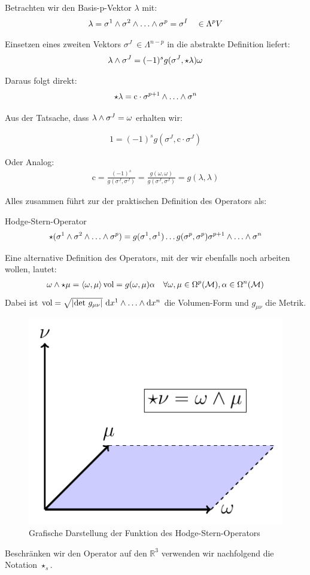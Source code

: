  Betrachten wir den Basis-p-Vektor $\lambda$ mit:
 \begin{align}
 \lambda = \sigma^1 \w \sigma^2 \w \dots \w \sigma^p = \sigma^{I} \quad \in \Lambda^p V
 \end{align}
 
 Einsetzen eines zweiten Vektors $\sigma^J \ \in \Lambda^{n-p}$ in die abstrakte Definition liefert:
\begin{align}
\lambda \wedge \sigma^J = (-1)^s g(\sigma^J,\star \lambda)\omega
\end{align}

Daraus folgt direkt:
\begin{align}
\star\lambda = \text{c} \cdot \sigma^{p+1} \w \dots \w \sigma^n
\end{align}

Aus der Tatsache, dass $\lambda\wedge\sigma^J = \omega$ erhalten wir:

\begin{align}
1 = (-1)^s g(\sigma^J,\text{c}\cdot\sigma^J)
\end{align}

Oder Analog:
\begin{align}
\text{c}= \frac{(-1)^s}{g(\sigma^J,\sigma^J)} = \frac{g(\omega,\omega)}{g(\sigma^J,\sigma^J)} = g(\lambda,\lambda)
\end{align}

Alles zusammen führt zur der praktischen Definition des Operators als:
\begin{mybox}{Hodge-Stern-Operator}
\begin{align}
\star(\sigma^1 \w \sigma^2 \w \dots \w \sigma^p) = g(\sigma^1,\sigma^1)\dots g(\sigma^p,\sigma^p) \sigma^{p+1}\w \dots \w \sigma^n
\end{align}
\end{mybox}



Eine alternative Definition des Operators, mit der wir ebenfalls noch arbeiten wollen, lautet:
\begin{align}
\omega \wedge \star \mu = \left<\omega,\mu \right>\text{vol} = g(\omega,\mu)\alpha \quad \forall \omega, \mu \in \Omega^p(\mathcal{M}), \alpha \in \Omega^n(\mathcal{M})
\end{align}
Dabei ist $\text{vol} = \sqrt{\abs{\text{det} \ g_{\mu\nu}}} \ \dd x^1 \w \dots \w \dd x^n$ die Volumen-Form und $g_{\mu\nu}$ die Metrik. \\
\begin{figure}[H]
	\centering
	\includegraphics[width=.3\linewidth]{figures/darstellung-hodge.pdf}
	\caption{Grafische Darstellung der Funktion des Hodge-Stern-Operators}
\end{figure}
Beschränken wir den Operator auf den $\mathbb{R}^3$ verwenden wir nachfolgend die Notation $\star_s$.
